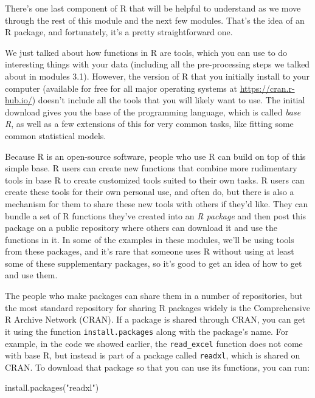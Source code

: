 \documentclass[]{tufte-book}
\newenvironment{Shaded}{}{}
\newcommand{\FunctionTok}[1]{\textcolor[rgb]{0.02,0.16,0.49}{#1}}
\newcommand{\NormalTok}[1]{#1}
\newcommand{\StringTok}[1]{\textcolor[rgb]{0.25,0.44,0.63}{#1}}
\begin{document}
There's one last component of R that will be helpful to understand as we move through
the rest of this module and the next few modules. That's the idea of an R package, and
fortunately, it's a pretty straightforward one.

We just talked about how functions in R are tools, which you can use to do interesting
things with your data (including all the pre-processing steps we talked about in
modules 3.1). However, the version of R that you initially install to your computer
(available for free for all major operating systems at \url{https://cran.r-hub.io/}) doesn't
include all the tools that you will likely want to use. The initial download gives you
the base of the programming language, which is called \emph{base R}, as well as a few
extensions of this for very common tasks, like fitting some common statistical models.

Because R is an open-source software, people who use R can build on top of this
simple base. R users can create new functions that combine more rudimentary
tools in base R to create customized tools suited to their own tasks. R users
can create these tools for their own personal use, and often do, but there is
also a mechanism for them to share these new tools with others if they'd like.
They can bundle a set of R functions they've created into an \emph{R package} and
then post this package on a public repository where others can download it and
use the functions in it. In some of the examples in these modules, we'll be
using tools from these packages, and it's rare that someone uses R without using
at least some of these supplementary packages, so it's good to get an idea of
how to get and use them.

The people who make packages can share them in a number of repositories, but the
most standard repository for sharing R packages widely is the Comprehensive R
Archive Network (CRAN). If a package is shared through CRAN, you can get it
using the function \texttt{install.packages} along with the package's name. For
example, in the code we showed earlier, the \texttt{read\_excel} function does not come
with base R, but instead is part of a package called \texttt{readxl}, which is shared
on CRAN. To download that package so that you can use its functions, you can
run:

\begin{Shaded}
\begin{Highlighting}[]
\FunctionTok{install.packages}\NormalTok{(}\StringTok{"readxl"}\NormalTok{)}
\end{Highlighting}
\end{Shaded}
\end{document}

